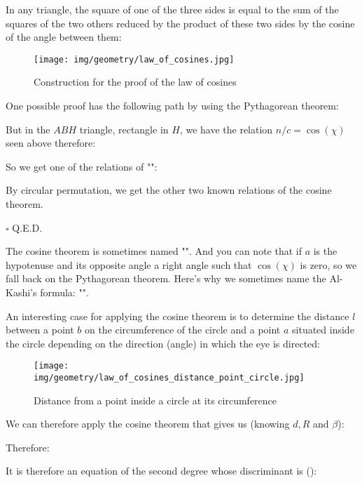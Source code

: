 	\begin{theorem}
	In any triangle, the square of one of the three sides is equal to the sum of the squares of the two others reduced by the product of these two sides by the cosine of the angle between them:
	\begin{figure}[H]
	\centering
	\texttt{[image: img/geometry/law\_of\_cosines.jpg]}
	\caption{Construction for the proof of the law of cosines}
	\end{figure}
	\end{theorem}
	\begin{dem}
	One possible proof has the following path by using the Pythagorean theorem:
	
	But in the $ABH$ triangle, rectangle in $H$, we have the relation $n/c=\cos(\chi)$ seen above therefore:
	
	So we get one of the relations of "":
	
	By circular permutation, we get the other two known relations of the cosine theorem.
	\begin{flushright}
		$\square$  Q.E.D.
	\end{flushright}
	\end{dem}
	\begin{tcolorbox}[title=Remark,colframe=black,arc=10pt]
	The cosine theorem is sometimes named  "". And you can note that if $a$ is the hypotenuse and its opposite angle a right angle such that $\cos(\chi)$ is zero, so we fall back on the Pythagorean theorem. Here's why we sometimes name the Al-Kashi's formula: "".
	\end{tcolorbox}
	An interesting case for applying the cosine theorem is to determine the distance $l$ between a point $b$ on the circumference of the circle and a point $a$ situated inside the circle depending on the direction (angle) in which the eye is directed:
	\begin{figure}[H]
	\centering
	\texttt{[image: img/geometry/law\_of\_cosines\_distance\_point\_circle.jpg]}
	\caption{Distance from a point inside a circle at its circumference}
	\end{figure}
	We can therefore apply the cosine theorem that gives us (knowing $d, R$ and $\beta$):
	
	Therefore:
	
	It is therefore an equation of the second degree whose discriminant is ():
	
